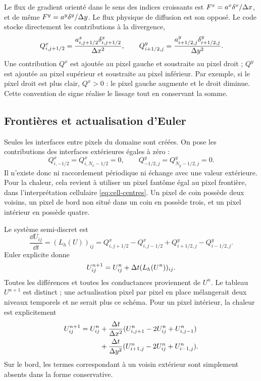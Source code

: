 Le flux de gradient orienté dans le sens des indices croissants est
$F^x=a^x\delta^x/\Delta x$, et de même $F^y=a^y\delta^y/\Delta y$.
Le flux physique de diffusion est son opposé. Le code stocke
directement les contributions à la divergence,
\begin{equation}
 Q^x_{i,j+1/2}=\frac{a^x_{i,j+1/2}\delta^x_{i,j+1/2}}{\Delta x^2},
 \qquad
 Q^y_{i+1/2,j}=\frac{a^y_{i+1/2,j}\delta^y_{i+1/2,j}}{\Delta y^2}.
 \label{eq:edge-contributions}
\end{equation}
Une contribution $Q^x$ est ajoutée au pixel gauche et soustraite
au pixel droit ; $Q^y$ est ajoutée au pixel supérieur et soustraite
au pixel inférieur. Par exemple, si le pixel droit est plus clair,
$Q^x>0$ : le pixel gauche augmente et le droit diminue. Cette convention
de signe réalise le lissage tout en conservant la somme.

\subsection{Frontières et actualisation d'Euler}

Seules les interfaces entre pixels du domaine sont créées. On pose
les contributions des interfaces extérieures égales à zéro :
\begin{equation}
 Q^x_{i,-1/2}=Q^x_{i,N_x-1/2}=0,\qquad
 Q^y_{-1/2,j}=Q^y_{N_y-1/2,j}=0.
 \label{eq:boundary-edges}
\end{equation}
Il n'existe donc ni raccordement périodique ni échange avec une valeur
extérieure. Pour la chaleur, cela revient à utiliser un pixel fantôme
égal au pixel frontière, dans l'interprétation cellulaire
\eqref{eq:cell-centres}. Un pixel de coin possède deux voisins,
un pixel de bord non situé dans un coin en possède trois, et un pixel
intérieur en possède quatre.

Le système semi-discret est
\begin{equation}
 \frac{\dd U_{ij}}{\dd t}=(L_h(U))_{ij}
 =Q^x_{i,j+1/2}-Q^x_{i,j-1/2}
  +Q^y_{i+1/2,j}-Q^y_{i-1/2,j}.
 \label{eq:semidiscrete-directional}
\end{equation}
Euler explicite donne
\begin{equation}
 U^{n+1}_{ij}=U^n_{ij}+\Delta t(L_h(U^n))_{ij}.
 \label{eq:explicit-euler}
\end{equation}
Toutes les différences et toutes les conductances proviennent de
$U^n$. Le tableau $U^{n+1}$ est distinct ; une actualisation pixel
par pixel en place mélangerait deux niveaux temporels et ne serait
plus ce schéma. Pour un pixel intérieur, la chaleur est explicitement
\begin{align}
 U^{n+1}_{ij}=U^n_{ij}
 &+\frac{\Delta t}{\Delta x^2}
    (U^n_{i,j+1}-2U^n_{ij}+U^n_{i,j-1})\notag\\
 &+\frac{\Delta t}{\Delta y^2}
    (U^n_{i+1,j}-2U^n_{ij}+U^n_{i-1,j}).
 \label{eq:heat-stencil}
\end{align}
Sur le bord, les termes correspondant à un voisin extérieur sont
simplement absents dans la forme conservative.

